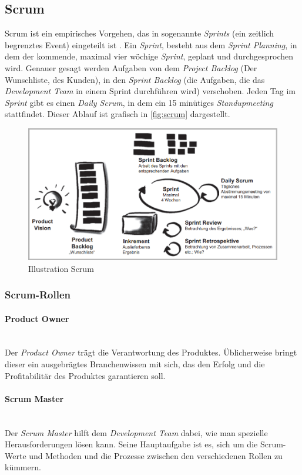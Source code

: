 \subsection{Scrum}
Scrum ist ein empirisches Vorgehen, das in sogenannte \textit{Sprints} (ein zeitlich begrenztes Event) eingeteilt ist \cite{pm-agil-ursula}. Ein \textit{Sprint}, besteht aus dem \textit{Sprint Planning}, in dem der kommende, maximal vier wöchige \textit{Sprint}, geplant und durchgesprochen wird. Genauer gesagt werden Aufgaben von dem \textit{Project Backlog} (Der Wunschliste, des Kunden), in den \textit{Sprint Backlog} (die Aufgaben, die das \textit{Development Team} in einem Sprint durchführen wird) verschoben. Jeden Tag im \textit{Sprint} gibt es einen \textit{Daily Scrum}, in dem ein 15 minütiges \textit{Standupmeeting} stattfindet. Dieser Ablauf ist grafisch in \autoref{fig:scrum} dargestellt.
\begin{figure}[H]
	\centering
	\includegraphics[width=0.6\linewidth]{images/projektmanagement/scrum2}
	\caption[Scrum]{Illustration Scrum \cite{pm-agil-ursula}}
	\label{fig:scrum}
\end{figure}
\subsubsection{Scrum-Rollen}
\paragraph{Product Owner}~\\
Der \textit{Product Owner} trägt die Verantwortung des Produktes. Üblicherweise bringt dieser ein ausgebrägtes Branchenwissen mit sich, das den Erfolg und die Profitabilitär des Produktes garantieren soll.
\paragraph{Scrum Master}~\\
Der \textit{Scrum Master} hilft dem \textit{Development Team} dabei, wie man spezielle Herausforderungen lösen kann. Seine Hauptaufgabe ist es, sich um die Scrum-Werte und Methoden und die Prozesse zwischen den verschiedenen Rollen zu kümmern.
